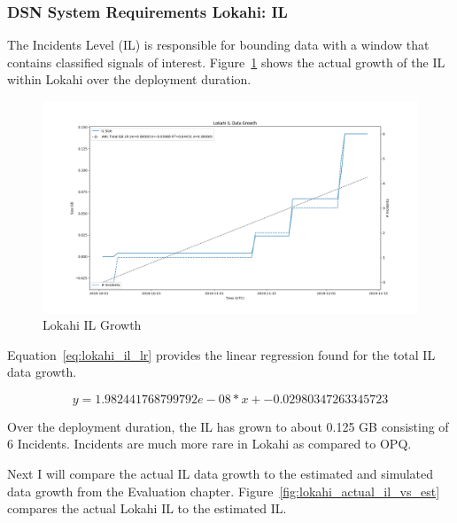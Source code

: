 \subsubsection{DSN System Requirements Lokahi: IL}

The Incidents Level (IL) is responsible for bounding data with a window that contains classified signals of interest. Figure~\ref{fig:lokahi_actual_il} shows the actual growth of the IL within Lokahi over the deployment duration.

\begin{figure}[H]
    \centering
    \includegraphics[width=\linewidth]{figures/lokahi_actual_il.png}
    \caption{Lokahi IL Growth}
    \label{fig:lokahi_actual_il}
\end{figure}

Equation~\ref{eq:lokahi_il_lr} provides the linear regression found for the total IL data growth.

\begin{equation}
    y = 1.982441768799792e-08 * x + -0.02980347263345723
    \label{eq:lokahi_il_lr}
\end{equation}

Over the deployment duration, the IL has grown to about 0.125 GB consisting of 6 Incidents. Incidents are much more rare in Lokahi as compared to OPQ.

Next I will compare the actual IL data growth to the estimated and simulated data growth from the Evaluation chapter. Figure~\ref{fig:lokahi_actual_il_vs_est} compares the actual Lokahi IL to the estimated IL.

